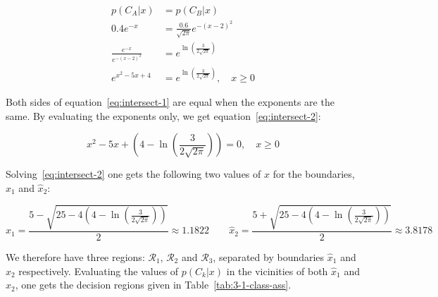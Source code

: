 \documentclass[paper=a4, fontsize=11pt]{scrartcl} %
\numberwithin{equation}{section} %
\numberwithin{figure}{section} %
\numberwithin{table}{section} %
\begin{document}
\begin{equation}
\begin{split}
    p(C_A|x) & = p(C_B|x) \\
    \text{0.4}e^{-x} & = \frac{\text{0.6}}{\sqrt{2\pi}}e^{-(x-2)^2} \\
    \frac{e^{-x}}{e^{-(x-2)^2}} & = e^{\ln\left(\frac{\text{3}}{2\sqrt{2\pi}}\right)} \\
    e^{x^2-5x+4} & = e^{\ln\left(\frac{\text{3}}{2\sqrt{2\pi}}\right)}, \quad x \geq 0
    \label{eq:intersect-1}
\end{split}
\end{equation}

Both sides of equation~\ref{eq:intersect-1} are equal when the exponents are the 
same. By evaluating the exponents only, we get equation~\ref{eq:intersect-2}:

\begin{equation}
    x^2-5x+\left(4 - \ln\left(\frac{\text{3}}{2\sqrt{2\pi}}\right)\right) = 0, \quad x \geq 0
    \label{eq:intersect-2}
\end{equation}

Solving~\ref{eq:intersect-2} one gets the following two values of $x$ for the 
boundaries, $\hat{x}_{1}$ and $\hat{x}_{2}$:

\[ \hat{x}_{1} = \frac{5 - \sqrt{25 - 4\left(4 - \ln\left(\frac{\text{3}}{2\sqrt{2\pi}}\right)\right)}}{2} \approx 1.1822 
    \quad \quad \hat{x}_{2} = \frac{5 + \sqrt{25 - 4\left(4 - \ln\left(\frac{\text{3}}{2\sqrt{2\pi}}\right)\right)}}{2} \approx 3.8178 \] 

We therefore have three regions: $\mathcal{R}_{1}$, $\mathcal{R}_{2}$ and 
$\mathcal{R}_{3}$, separated by boundaries $\hat{x}_{1}$ and $\hat{x}_{2}$ 
respectively. Evaluating the values of $p(C_k|x)$ in the vicinities of both 
$\hat{x}_{1}$ and $\hat{x}_{2}$, one gets the decision regions given in 
Table~\ref{tab:3-1-class-ass}.\\
\end{document}
